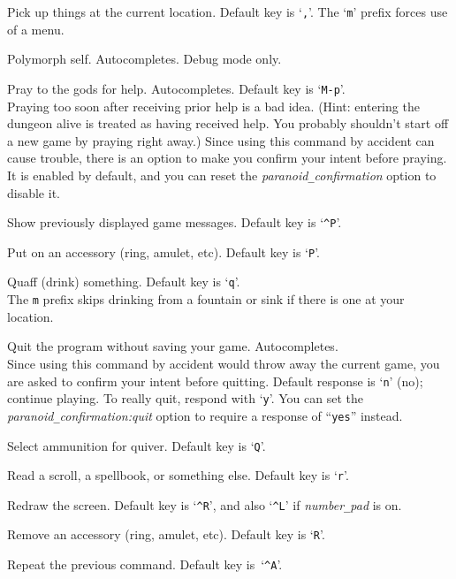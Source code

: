 Pick up things at the current location. Default key is `{\tt ,}'.
The `{\tt m}' prefix forces use of a menu.
\item[\tb{\#polyself}]
Polymorph self.
Autocompletes.
Debug mode only.
\item[\tb{\#pray}]
Pray to the gods for help. Autocompletes. Default key is `{\tt M-p}'.\\
Praying too soon after receiving prior help is a bad idea.
(Hint: entering the dungeon alive is treated as having received help.
You probably shouldn't start off a new game by praying right away.)
Since using this command by accident can cause trouble, there is an
option to make you confirm your intent before praying.  It is enabled
by default, and you can reset the
{\it paranoid\verb+_+confirmation\/}
option to disable it.
\item[\tb{\#prevmsg}]
Show previously displayed game messages. Default key is `{\tt \^{}P}'.
\item[\tb{\#puton}]
Put on an accessory (ring, amulet, etc). Default key is `{\tt P}'.
\item[\tb{\#quaff}]
Quaff (drink) something. Default key is `{\tt q}'.\\
The {\tt m} prefix skips drinking from a fountain or sink if there
is one at your location.
\item[\tb{\#quit}]
Quit the program without saving your game. Autocompletes.\\
Since using this command by accident would throw away the current game,
you are asked to confirm your intent before quitting.
Default response is `{\tt n}' (no); continue playing.
To really quit, respond with `{\tt y}'.
You can set the
{\it paranoid\verb+_+confirmation:quit\/}
option to require a response of ``{\tt yes}'' instead.
\item[\tb{\#quiver}]
Select ammunition for quiver. Default key is `{\tt Q}'.
\item[\tb{\#read}]
Read a scroll, a spellbook, or something else. Default key is `{\tt r}'.
\item[\tb{\#redraw}]
Redraw the screen.
Default key is `{\tt \^{}R}',
and also `{\tt \^{}L}' if {\it number\verb+_+pad\/} is on.
\item[\tb{\#remove}]
Remove an accessory (ring, amulet, etc). Default key is `{\tt R}'.
\item[{\bb{\#repeat}}]
Repeat the previous command.
Default key is~`{\tt \^{}A}'.
\item[\tb{\#reqmenu}]
